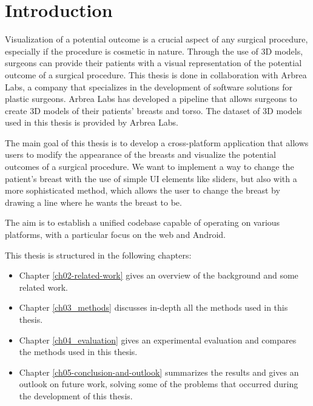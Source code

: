 \setcounter{chapter}{0}

\chapter{Introduction}

Visualization of a potential outcome is a crucial aspect of any surgical procedure, especially if the procedure is cosmetic in nature. Through the use of 3D models, surgeons can
provide their patients with a visual representation of the potential outcome of a surgical procedure. This thesis is done in collaboration with Arbrea Labs, a company that specializes in the development of
software solutions for plastic surgeons. Arbrea Labs has developed a pipeline that allows surgeons to create 3D models of their patients' breasts and torso. The dataset of 3D models used in this thesis is
provided by Arbrea Labs.

The main goal of this thesis is to develop a cross-platform application that allows users to modify the appearance of the breasts and visualize the potential outcomes of a surgical procedure. We want to implement
a way to change the patient's breast with the use of simple UI elements like sliders, but also with a more sophisticated method, which allows the user to change the breast by drawing a line where he wants the breast to be.

The aim is to establish a unified codebase capable of operating on various platforms, with a particular focus on the web and Android.

This thesis is structured in the following chapters:
\begin{itemize}
    \item Chapter \ref{ch02-related-work} gives an overview of the background and some related work.
    \item Chapter \ref{ch03_methods} discusses in-depth all the methods used in this thesis.
    \item Chapter \ref{ch04_evaluation} gives an experimental evaluation and compares the methods used in this thesis.
    \item Chapter \ref{ch05-conclusion-and-outlook} summarizes the results and gives an outlook on future work, solving some of the problems that occurred during the development of this thesis.
\end{itemize}

